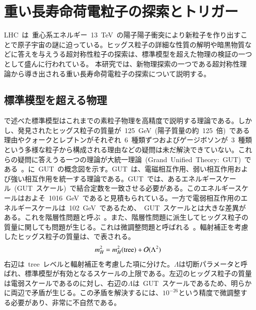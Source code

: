 \chapter{重い長寿命荷電粒子の探索とトリガー}
\thispagestyle{empty}
\label{chap:3}
LHC~は~重心系エネルギー~13~TeV~の陽子陽子衝突により新粒子を作り出すことで原子宇宙の謎に迫っている。ヒッグス粒子の詳細な性質の解明や暗黒物質などに答えを与えうる超対称性粒子の探索は、標準模型を超えた物理の検証の一つとして盛んに行われている。
本研究では、新物理探索の一つである超対称性理論から導き出される重い長寿命荷電粒子の探索について説明する。

\section{標準模型を超える物理}
\label{sec:BSM}
で述べた標準模型はこれまでの素粒子物理を高精度で説明する理論である。しかし、発見されたヒッグス粒子の質量が~125~GeV~(陽子質量の約~125~倍)~である理由やクォークとレプトンがそれぞれ~6~種類ずつおよびゲージボソンが~3~種類という多様な粒子から構成される理由などの疑問は未だ解決できていない。これらの疑問に答えうる一つの理論が大統一理論~(Grand~Unified~Theory:~GUT)~である~\cite{AR:10}。に~GUT~の概念図を示す。GUT~は、電磁相互作用、弱い相互作用および強い相互作用を統一する理論である。GUT~では、あるエネルギースケール~(GUT~スケール)~で結合定数を一致させる必要がある。このエネルギースケールはおよそ~1016~GeV~であると見積もられている。一方で電弱相互作用のエネルギースケールは~102~GeV~であるため、~GUT~スケールとは大きな差異がある。これを階層性問題と呼ぶ~\cite{AR:06}。また、階層性問題に派生してヒッグス粒子の質量に関しても問題が生じる。これは微調整問題と呼ばれる~\cite{AR:06}。輻射補正を考慮したヒッグス粒子の質量は、で表される。
\begin{align}
    m_{H}^2=m_{H}^2(\rm{tree})+\mathcal{O}(\Lambda^2) \label{eq:higgs}
\end{align}
右辺は~tree~レベルと輻射補正を考慮した項に分けた。$\Lambda$は切断パラメータと呼ばれ、標準模型が有効となるスケールの上限である。左辺のヒッグス粒子の質量は電弱スケールであるのに対し、右辺の$\Lambda$は~GUT~スケールであるため、明らかに両辺で矛盾が生じる。この矛盾を解決するには、$10^{-26}$という精度で微調整する必要があり、非常に不自然である。


